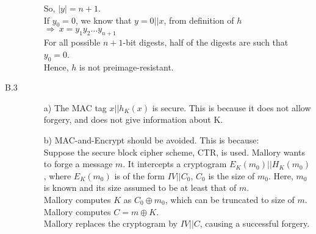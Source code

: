 \documentclass{article}
\begin{document}
\begin{description}[leftmargin=3pt]
\begin{framed}
\begin{description}
\begin{enumerate}
				So, $|y| = n+1$.\\
				If $y_0 = 0$, we know that $y = 0 || x$, from definition of $h$\\
				$\Rightarrow\ x = y_1y_2\dots y_{n+1}$\\
				For all possible $n+1$-bit digests, half of the digests are such that $y_0 = 0$.\\
				Hence, {\color{blue}$h$ is not preimage-resistant.}
			\end{enumerate}
			\item[B.3] 
			\begin{enumerate}
				\item[a)]
				The MAC tag $x||h_K(x)$ is secure. This is because it does not allow forgery, and does not give information about K.
				\item[b)] MAC-and-Encrypt should be avoided. This is because:\\
				Suppose the secure block cipher scheme, CTR, is used. Mallory wants to forge a message $m$. It intercepts a cryptogram $E_K(m_0)||H_K(m_0)$, where $E_K(m_0)$ is of the form $IV||C_0$, $C_0$ is the size of $m_0$. Here, $m_0$ is known and its size assumed to be at least that of $m$.\\
				Mallory computes $K$ as $C_0\oplus m_0$, which can be truncated to size of $m$.\\
				Mallory computes $C = m\oplus K$.\\
				Mallory replaces the cryptogram by $IV||C$, causing a successful forgery.
			\end{enumerate}
		\end{description}
	\end{framed}
\end{description}
\end{document}
